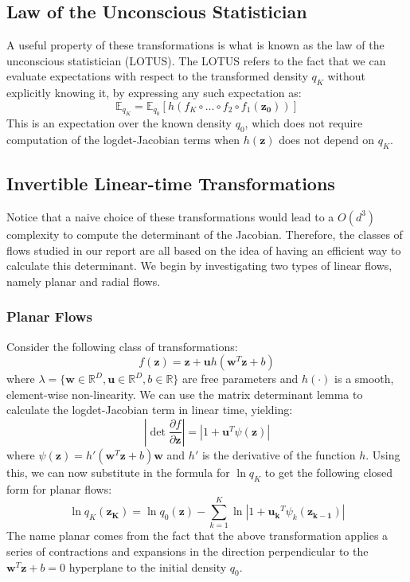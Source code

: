 \subsection*{Law of the Unconscious Statistician}
A useful property of these transformations is what is known as the law of the unconscious statistician (LOTUS). The LOTUS refers to the fact that we can evaluate expectations with respect to the transformed density $q_K$ without explicitly knowing it, by expressing any such expectation as:
\[ \mathbb{E}_{q_K} = \mathbb{E}_{q_0}[h(f_K \circ ... \circ f_2 \circ f_1(\mathbf{z_0}))] \]
This is an expectation over the known density $q_0$, which does not require computation of the logdet-Jacobian terms when $h(\mathbf{z})$ does not depend on $q_K$.

\subsection*{Invertible Linear-time Transformations}
Notice that a naive choice of these transformations would lead to a $O(d^3)$ complexity to compute the determinant of the Jacobian. Therefore, the classes of flows studied in our report are all based on the idea of having an efficient way to calculate this determinant. We begin by investigating two types of linear flows, namely planar and radial flows. 

\subsubsection*{Planar Flows}
Consider the following class of transformations:
\[ f(\mathbf{z}) = \mathbf{z}+\mathbf{u}h(\mathbf{w}^T\mathbf{z}+b) \]
where $\lambda = \{ \mathbf{w} \in \mathbb{R}^D, \mathbf{u} \in \mathbb{R}^D, b \in \mathbb{R} \}$ are free parameters and $h(\cdot)$ is a smooth, element-wise non-linearity. We can use the matrix determinant lemma to calculate the logdet-Jacobian term in linear time, yielding:
\[ \left| \det \frac{\partial f}{\partial \mathbf{z}} \right| = \left| 1+\mathbf{u}^T\psi(\mathbf{z})\right| \]
where $\psi(\mathbf{z}) = h'(\mathbf{w}^T\mathbf{z}+b)\mathbf{w}$ and $h'$ is the derivative of the function $h$. Using this, we can now substitute in the formula for $\ln q_K$ to get the following closed form for planar flows:
\[ \ln q_K (\mathbf{z_K}) = \ln q_0(\mathbf{z}) - \sum_{k=1}^K \ln \left| 1+\mathbf{u_k}^T\psi_k(\mathbf{z_{k-1}})\right| \]
The name planar comes from the fact that the above transformation applies a series of contractions and expansions in the direction perpendicular to the $\mathbf{w}^T\mathbf{z}+b = 0$ hyperplane to the initial density $q_0$.

